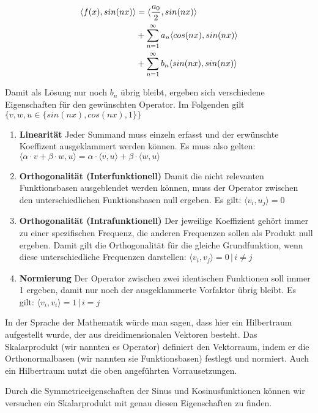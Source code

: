 \begin{align}
  \langle f(x), sin(n x) \rangle &= \langle \frac{a_0}{2}, sin(n x) \rangle \notag\\
  &+ \sum_{n = 1}^{\infty} a_n \langle cos(n x), sin(n x) \rangle \notag \\
  &+ \sum_{n = 1}^{\infty} b_n \langle sin(n x), sin(n x) \rangle \label{algn:skalarprodukt}
\end{align}

Damit als Lösung nur noch $b_n$ übrig bleibt, ergeben sich verschiedene Eigenschaften für den gewünschten Operator. Im Folgenden gilt $ \{ v, w, u \in \{ sin(n x), cos(n x), 1 \}\} $

\begin{enumerate}
  \item \textbf{Linearität} Jeder Summand muss einzeln erfasst und der erwünschte Koeffizent ausgeklammert werden können. Es muss also gelten: $\langle \alpha \cdot v + \beta \cdot w, u \rangle = \alpha \cdot \langle v, u \rangle + \beta \cdot \langle w, u \rangle $
  \item \textbf{Orthogonalität (Interfunktionell)} Damit die nicht relevanten Funktionsbasen ausgeblendet werden können, muss der Operator zwischen den  unterschiedlichen Funktionsbasen null ergeben. Es gilt: $ \langle v_i, u_j \rangle = 0 $
  \item \textbf{Orthogonalität (Intrafunktionell)} Der jeweilige Koeffizient gehört immer zu einer spezifischen Frequenz, die anderen Frequenzen sollen als Produkt null ergeben. Damit gilt die Orthogonalität für die gleiche Grundfunktion, wenn diese unterschiedliche Frequenzen darstellen: $ \langle v_i, v_j \rangle = 0 \, | \, i \not= j $
  \item \textbf{Normierung} Der Operator zwischen zwei identischen Funktionen soll immer 1 ergeben, damit nur noch der ausgeklammerte Vorfaktor übrig bleibt. Es gilt: $ \langle v_i, v_i \rangle = 1 \, | \, i = j $
\end{enumerate}

In der Sprache der Mathematik würde man sagen, dass hier ein Hilbertraum aufgestellt wurde, der aus dreidimensionalen Vektoren besteht. Das Skalarprodukt (wir nannten es Operator) definiert den Vektorraum, indem er die Orthonormalbasen (wir nannten sie Funktionsbasen) festlegt und normiert. Auch ein Hilbertraum nutzt die oben angeführten Vorrausetzungen. \cite{web:gsi98}

Durch die Symmetrieeigenschaften der Sinus und Kosinusfunktionen können wir versuchen ein Skalarprodukt mit genau diesen Eigenschaften zu finden.

